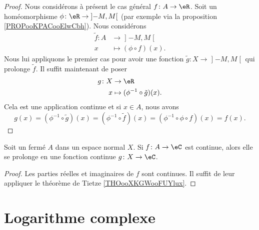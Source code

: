 \begin{proof}
		Nous considérons à présent le cas général \( f\colon A\to \eR\). Soit un homéomorphisme \( \phi\colon \eR\to \mathopen] -M , M \mathclose[\) (par exemple via la proposition \ref{PROPooKPACooElwCbh}). Nous considérons
		\begin{equation}
			\begin{aligned}
				\tilde f\colon A & \to \mathopen] -M , M \mathclose[ \\
				x                & \mapsto (\phi\circ f)(x).
			\end{aligned}
		\end{equation}
		Nous lui appliquons le premier cas pour avoir une fonction \( \tilde g\colon X\to \mathopen] -M , M \mathclose[\) qui prolonge \( \tilde f\). Il suffit maintenant de poser
	\begin{equation}
		\begin{aligned}
			g\colon X & \to \eR                              \\
			x         & \mapsto (\phi^{-1}\circ\tilde g)(x).
		\end{aligned}
	\end{equation}
	Cela est une application continue et si \( x\in A\), nous avons
	\begin{equation}
		g(x)=(\phi^{-1}\circ \tilde g)(x)=(\phi^{-1}\circ \tilde f)(x)=(\phi^{-1}\circ\phi\circ f)(x)=f(x).
	\end{equation}
\end{proof}

\begin{corollary}
	Soit un fermé \( A\) dans un espace normal \( X\). Si \( f\colon A\to \eC\) est continue, alors elle se prolonge en une fonction continue \( g\colon X\to \eC\).
\end{corollary}

\begin{proof}
	Les parties réelles et imaginaires de \( f\) sont continues. Il suffit de leur appliquer le théorème de Tietze \ref{THOooXKGWooFUYlux}.
\end{proof}

\section{Logarithme complexe}

